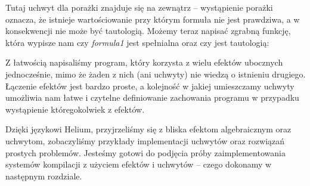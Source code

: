 Tutaj uchwyt dla porażki znajduje się na zewnątrz -- wystąpienie porażki oznacza, że istnieje wartościowanie przy którym formuła nie jest prawdziwa, a w konsekwencji nie może być tautologią. Możemy teraz napisać zgrabną funkcję, która wypisze nam czy \textit{formula1} jest spełnialna oraz czy jest tautologią:



Z łatwością napisaliśmy program, który korzysta z wielu efektów ubocznych jednocześnie, mimo że żaden z nich (ani uchwyty) nie wiedzą o istnieniu drugiego. Łączenie efektów jest bardzo proste, a kolejność w jakiej umieszczamy uchwyty umożliwia nam łatwe i czytelne definiowanie zachowania programu w przypadku wystąpienie któregokolwiek z efektów.

Dzięki językowi Helium, przyjrzeliśmy się z bliska efektom algebraicznym oraz uchwytom, zobaczyliśmy przykłady implementacji uchwytów oraz rozwiązań prostych problemów. Jesteśmy gotowi do podjęcia próby zaimplementowania systemów kompilacji z użyciem efektów i uchwytów -- czego dokonamy w następnym rozdziale.

